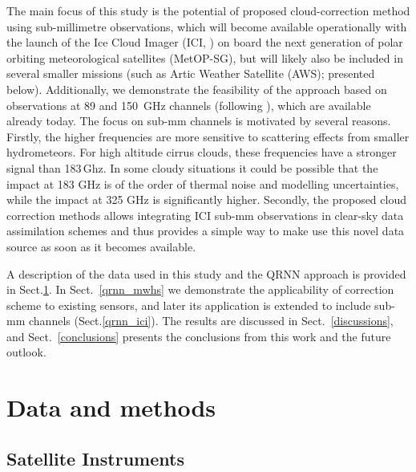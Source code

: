 \documentclass[amt, manuscript]{copernicus}
\begin{document}
The main focus of this study is the potential of proposed cloud-correction
method using sub-millimetre observations, which will become available
operationally with the launch of the Ice Cloud Imager (ICI,
\citet{eriksson:towar:20}) on board the next generation of polar orbiting
meteorological satellites (MetOP-SG), but will likely also be included in
several smaller missions (such as Artic Weather Satellite (AWS); presented
below). Additionally, we demonstrate the feasibility of the approach based on
observations at 89 and 150\ GHz channels (following
\citet{geer2015scatteringindex}), which are available already today. The focus
on sub-mm channels is motivated by several reasons. Firstly, the higher
frequencies are more sensitive to scattering effects from smaller
hydrometeors. For high altitude cirrus clouds, these frequencies have a stronger
signal than 183\,Ghz. In some cloudy situations it could be possible that the
impact at 183 GHz is of the order of thermal noise and modelling uncertainties,
while the impact at 325 GHz is significantly higher. Secondly, the proposed
cloud correction methods allows integrating ICI sub-mm observations in
clear-sky data assimilation schemes and thus provides a simple
way to make use this novel data source as soon as it becomes available.

A description of the data used in this study and the QRNN approach is provided
in Sect.\ref{data_methods}. In Sect.~\ref{qrnn_mwhs} we demonstrate the
applicability of correction scheme to existing sensors, and later its
application is extended to include sub-mm channels (Sect.\ref{qrnn_ici}). The
results are discussed in Sect.~\ref{discussions}, and Sect.~\ref{conclusions}
presents the conclusions from this work and the future outlook.

\section{Data and methods}
\label{data_methods}
%
\subsection{Satellite Instruments}
%
\end{document}
